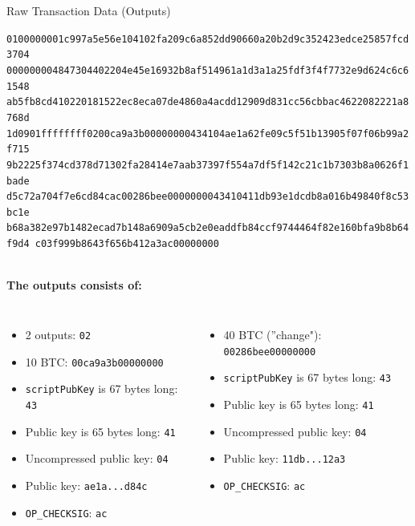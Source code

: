 \documentclass[handout]{beamer}
\begin{document}
\begin{frame}{Raw Transaction Data (Outputs)}
\begin{scriptsize}
\texttt{\textcolor{black!30}{0100000001c997a5e56e104102fa209c6a852dd90660a20b2d9c352423edce25857fcd3704
000000004847304402204e45e16932b8af514961a1d3a1a25fdf3f4f7732e9d624c6c61548
ab5fb8cd410220181522ec8eca07de4860a4acdd12909d831cc56cbbac4622082221a8768d
1d0901ffffffff}{\alert<2>{02}\alert<3>{00ca9a3b00000000}\alert<4>{43}\alert<5>{41}\alert<6>{04}\alert<7>{ae1a62fe09c5f51b13905f07f06b99a2f715
9b2225f374cd378d71302fa28414e7aab37397f554a7df5f142c21c1b7303b8a0626f1bade
d5c72a704f7e6cd84c}\alert<8>{ac}\alert<9>{00286bee00000000}\alert<10>{43}\alert<11>{41}\alert<12>{04}\alert<13>{11db93e1dcdb8a016b49840f8c53bc1e
b68a382e97b1482ecad7b148a6909a5cb2e0eaddfb84ccf9744464f82e160bfa9b8b64f9d4
c03f999b8643f656b412a3}\alert<14>{ac}}\textcolor{black!30}{00000000}}
\end{scriptsize}
\vspace{1em}
\scriptsize \\
\textbf{The outputs consists of:}\\
\begin{columns}[T]
\begin{itemize}
	\item \alert<2>{2 outputs: \texttt{02}}
	\item \alert<3>{10 BTC: \texttt{00ca9a3b00000000}}
	\item \alert<4>{\texttt{scriptPubKey} is 67 bytes long: \texttt{43}}
	\item \alert<5>{Public key is 65 bytes long: \texttt{41}}
	\item \alert<6>{Uncompressed public key: \texttt{04}}
	\item \alert<7>{Public key: \texttt{ae1a...d84c}}
	\item \textcolor{black!50}{\alert<8>{\texttt{OP\_CHECKSIG}: \texttt{ac}}}
\end{itemize}
\begin{itemize}
	\item \alert<9>{40 BTC (''change"): \texttt{00286bee00000000}}
	\item \alert<10>{\texttt{scriptPubKey} is 67 bytes long: \texttt{43}}
	\item \alert<11>{Public key is 65 bytes long: \texttt{41}}
	\item \alert<12>{Uncompressed public key: \texttt{04}}
	\item \alert<13>{Public key: \texttt{11db...12a3}}
	\item \textcolor{black!50}{\alert<14>{\texttt{OP\_CHECKSIG}: \texttt{ac}}}
\end{itemize}
\end{columns}

\end{frame}
\end{document}
